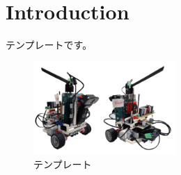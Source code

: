 \section{Introduction}\label{section:intro}

テンプレートです。\cite{bib:HELMHOLTZ_FURUSHO_EN}

\begin{figure}[H]   
  \centering   
  \includegraphics[width=0.48\textwidth]{img/template.pdf}
  \caption{テンプレート}
  \label{fig:template}
\end{figure}                                                                                                             
                 
